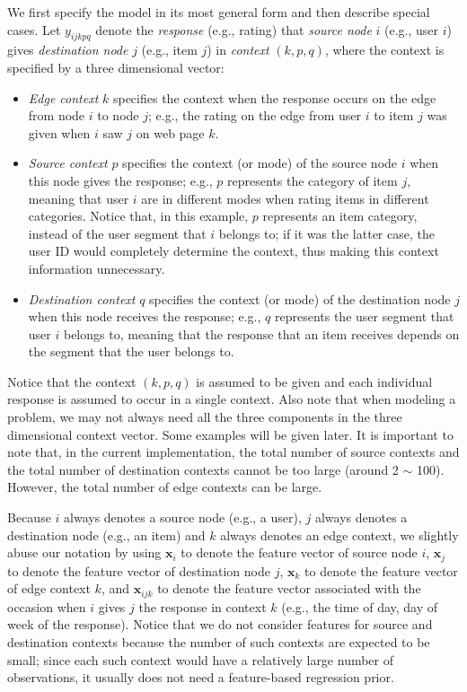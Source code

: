 \documentclass[10pt]{article}
\begin{document}
We first specify the model in its most general form and then describe special cases.  Let $y_{ijkpq}$ denote the {\em response} (e.g., rating) that {\em source node} $i$ (e.g., user $i$) gives {\em destination node} $j$ (e.g., item $j$) in {\em context} $(k,p,q)$, where the context is specified by a three dimensional vector:
\begin{itemize}
\item {\em Edge context} $k$ specifies the context when the response occurs on the edge from node $i$ to node $j$; e.g., the rating on the edge from user $i$ to item $j$ was given when $i$ saw $j$ on web page $k$.
\item {\em Source context} $p$ specifies the context (or mode) of the source node $i$ when this node gives the response; e.g., $p$ represents the category of item $j$, meaning that user $i$ are in different modes when rating items in different categories.  Notice that, in this example, $p$ represents an item category, instead of the user segment that $i$ belongs to; if it was the latter case, the user ID would completely determine the context, thus making this context information unnecessary.
\item {\em Destination context} $q$ specifies the context (or mode) of the destination node $j$ when this node receives the response; e.g., $q$ represents the user segment that user $i$ belongs to, meaning that the response that an item receives depends on the segment that the user belongs to.
\end{itemize}
Notice that the context $(k,p,q)$ is assumed to be given and each individual response is assumed to occur in a single context.  Also note that when modeling a problem, we may not always need all the three components in the three dimensional context vector.  Some examples will be given later.  It is important to note that, in the current implementation, the total number of source contexts and the total number of destination contexts cannot be too large (around 2 $\sim$ 100).  However, the total number of edge contexts can be large.

Because $i$ always denotes a source node (e.g., a user), $j$ always denotes a destination node (e.g., an item) and $k$ always denotes an edge context, we slightly abuse our notation by using $\bm{x}_i$ to denote the feature vector of source node $i$, $\bm{x}_j$ to denote the feature vector of destination node $j$, $\bm{x}_k$ to denote the feature vector of edge context $k$, and $\bm{x}_{ijk}$ to denote the feature vector associated with the occasion when $i$ gives $j$ the response in context $k$ (e.g., the time of day, day of week of the response).  Notice that we do not consider features for source and destination contexts because the number of such contexts are expected to be small; since each such context would have a relatively large number of observations, it usually does not need a feature-based regression prior.
\end{document}

